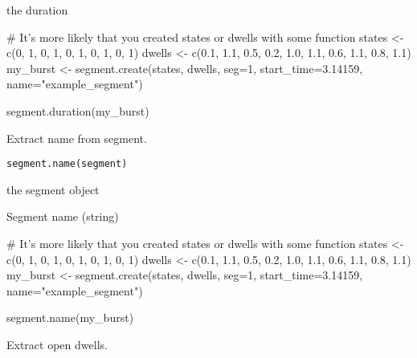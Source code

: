 \documentclass[letterpaper]{book}
\begin{document}
%
\begin{Value}
the duration
\end{Value}
%
\begin{Examples}
\begin{ExampleCode}

# It's more likely that you created states or dwells with some function
states  <-  c(0,      1,    0,    1,    0,    1,    0,    1,    0,    1)
dwells  <-  c(0.1,  1.1,  0.5,  0.2,  1.0,  1.1,  0.6,  1.1,  0.8,  1.1)
my_burst <- segment.create(states, dwells, seg=1, start_time=3.14159, name="example_segment")

segment.duration(my_burst)

\end{ExampleCode}
\end{Examples}
%
\begin{Description}\relax
Extract name from segment.
\end{Description}
%
\begin{Usage}
\begin{verbatim}
segment.name(segment)
\end{verbatim}
\end{Usage}
%
\begin{Arguments}
\begin{ldescription}
\item[\code{segment}] the segment object
\end{ldescription}
\end{Arguments}
%
\begin{Value}
Segment name (string)
\end{Value}
%
\begin{Examples}
\begin{ExampleCode}

# It's more likely that you created states or dwells with some function
states  <-  c(0,      1,    0,    1,    0,    1,    0,    1,    0,    1)
dwells  <-  c(0.1,  1.1,  0.5,  0.2,  1.0,  1.1,  0.6,  1.1,  0.8,  1.1)
my_burst <- segment.create(states, dwells, seg=1, start_time=3.14159, name="example_segment")

segment.name(my_burst)

\end{ExampleCode}
\end{Examples}
%
\begin{Description}\relax
Extract open dwells.
\end{Description}
\end{document}
